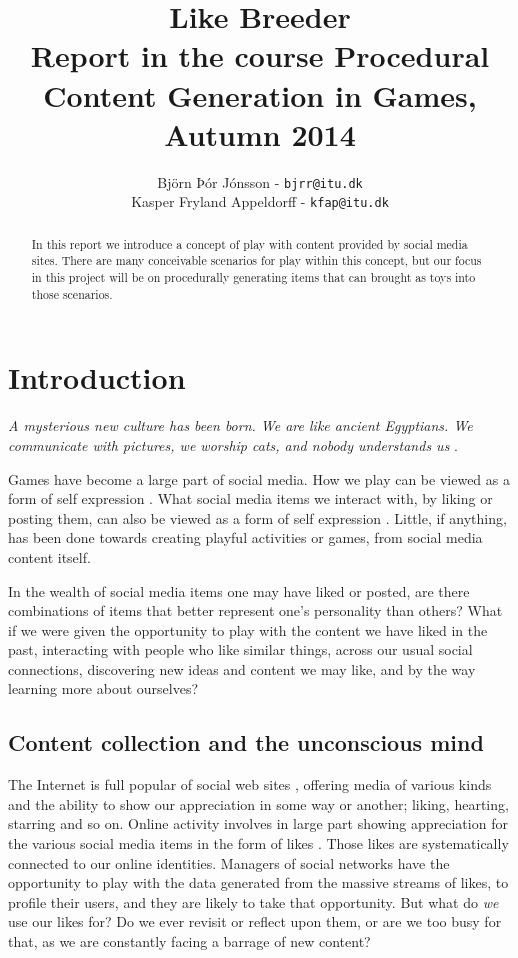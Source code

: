 \documentclass[conference]{IEEETran}
\title{Like Breeder\\ \small Report in the course Procedural Content Generation in Games, Autumn 2014}
\author{Björn Þór Jónsson - \texttt{bjrr@itu.dk}\\Kasper Fryland Appeldorff - \texttt{kfap@itu.dk}}
\begin{document}

\maketitle
\newpage
\begin{abstract}
In this report we introduce a concept of play with content provided by social media sites.  There are many conceivable scenarios for play within this concept, but our focus in this project will be on procedurally generating items that can brought as toys into those scenarios.
\end{abstract}



\section{Introduction}
\label{sec:Introduction}

\begin{center}
\textit{A mysterious new culture has been born. We are like ancient Egyptians. We communicate with pictures, we worship cats, and nobody understands us} \cite{gross2013makes}.
\end{center}


Games have become a large part of social media.  How we play can be viewed as a form of self expression \cite{sicart2014play}.  What social media items we interact with, by liking or posting them, can also be viewed as a form of self expression \cite{bargh2002can}.  Little, if anything, has been done towards creating playful activities or games, from social media content itself.

In the wealth of social media items one may have liked or posted, are there
combinations of items that better represent one's personality than others?  What if we were given the opportunity to play with the content we have liked in the past, interacting with people who like similar things, across our usual social connections, discovering new ideas and content we may like, and by the way learning more about ourselves?


\subsection{Content collection and the unconscious mind}

The Internet is full popular of social web sites \cite{LeadingSocialNetworks}, offering media of various kinds and the ability to show our appreciation in some way or another; liking, hearting, starring and so on.
Online activity involves in large part showing appreciation for the various social media items in the form of likes \cite{LM11}.  Those likes are systematically connected to our online identities.  Managers of social networks have the opportunity to play with the data generated from the massive streams of likes, to profile their users, and they are likely to take that opportunity.
But what do \textit{we} use our likes for?  Do we ever revisit or reflect upon them,  or are we too busy for that, as we are constantly facing a barrage of new content?
\end{document}
